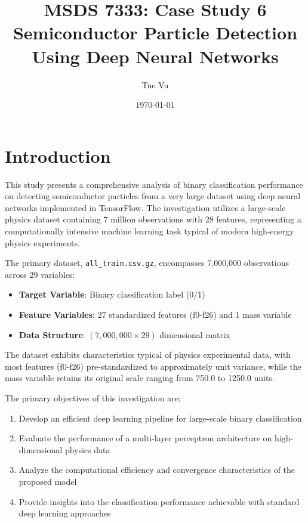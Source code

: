 \documentclass[12pt,a4paper]{article}
\title{\textbf{MSDS 7333: Case Study 6} \\ Semiconductor Particle Detection Using Deep Neural Networks}
\author{Tue Vu}
\date{\today}
\begin{document}
\maketitle

\newpage

\section{Introduction}

This study presents a comprehensive analysis of binary classification performance on detecting semiconductor particles from a very large dataset using deep neural networks implemented in TensorFlow.
The investigation utilizes a large-scale physics dataset containing 7 million observations with 28 features, representing a computationally intensive machine learning task typical of modern high-energy physics experiments.

The primary dataset, \texttt{all\_train.csv.gz}, encompasses 7,000,000 observations across 29 variables:
\begin{itemize}
    \item \textbf{Target Variable}: Binary classification label (0/1)
    \item \textbf{Feature Variables}: 27 standardized features (f0-f26) and 1 mass variable
    \item \textbf{Data Structure}: $(7,000,000 \times 29)$ dimensional matrix
\end{itemize}

The dataset exhibits characteristics typical of physics experimental data, with most features (f0-f26) pre-standardized to approximately unit variance, while the mass variable retains its original scale ranging from 750.0 to 1250.0 units.

The primary objectives of this investigation are:

\begin{enumerate}
    \item Develop an efficient deep learning pipeline for large-scale binary classification
    \item Evaluate the performance of a multi-layer perceptron architecture on high-dimensional physics data
    \item Analyze the computational efficiency and convergence characteristics of the proposed model
    \item Provide insights into the classification performance achievable with standard deep learning approaches
\end{enumerate}
\end{document}
